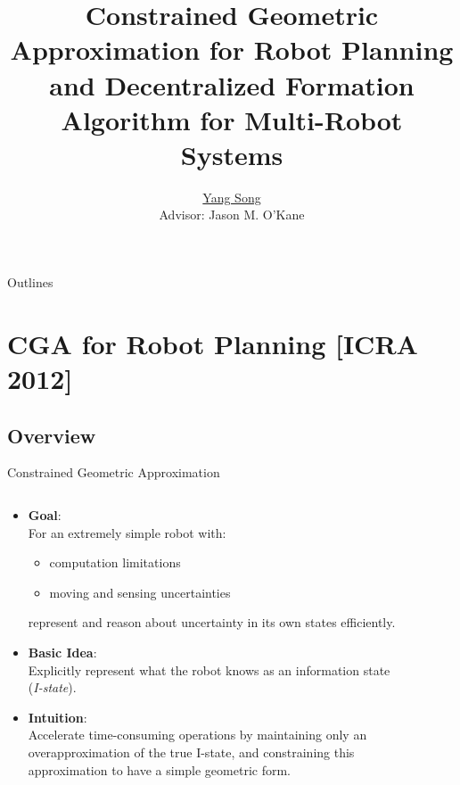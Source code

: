 \documentclass[10pt]{beamer}
\title[Ph.D. Proposal]{Constrained Geometric Approximation for Robot Planning and  Decentralized Formation Algorithm for Multi-Robot Systems}
\author[Yang Song]{
  \underline{Yang Song}\\
  Advisor: Jason M. O'Kane
}
\institute[
USC
] %
{ %
  Dept. of Computer Science and Engineering\\
  University of South Carolina
  
}
\begin{document}
\begin{frame}
  \titlepage
\end{frame}
\begin{frame}{Outlines}{}
\tableofcontents
\end{frame}

\section{CGA for Robot Planning [ICRA 2012]}
\subsection[Overview]{Overview}
\begin{frame}{Constrained Geometric Approximation}
\begin{columns}
  \begin{column}{.65\textwidth}
    \begin{itemize}
    \item \textbf{Goal}:\\
    For an extremely simple robot with:
    \begin{itemize}
    \item computation limitations
    \item moving and sensing uncertainties
    \end{itemize}
    represent and reason about uncertainty in its own states efficiently.\\
    \item \textbf{Basic Idea}:\\
    Explicitly represent what the robot knows as an information state (\textit{I-state}).
    \item \textbf{Intuition}:\\
    Accelerate time-consuming operations by maintaining only an \textcolor[rgb]{1.00,0.00,0.00}{overapproximation} of the true
    I-state, and constraining this approximation
    to have a simple geometric form.\\
    \end{itemize}
  \end{column}
  \begin{column}{.35\textwidth}
    \begin{figure}

\end{figure}
\end{column}
\end{columns}
\end{frame}
\end{document}
